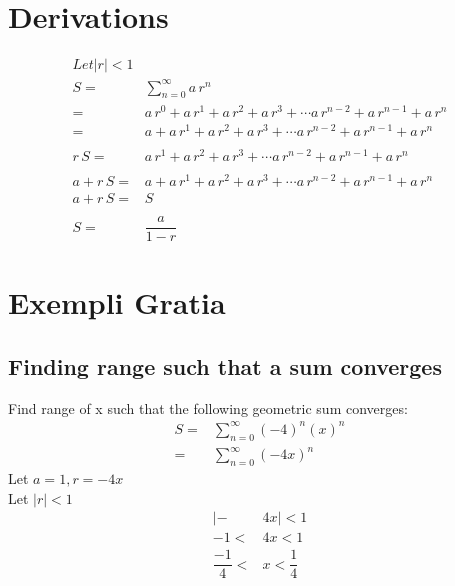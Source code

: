 \documentclass{article}
\begin{document}
\section{Derivations}
	\begin{align*}
			Let |r|<1\\
			S=&\sum_{n=0}^{\infty}a\,r^n\\
		 =&a\,r^0+a\,r^1+a\,r^2+a\,r^3+\cdots a\,r^{n-2}+a\,r^{n-1}+a\,r^{n}\\
		 =&a+a\,r^1+a\,r^2+a\,r^3+\cdots a\,r^{n-2}+a\,r^{n-1}+a\,r^{n}\\
		 \\
		 r\,S=&a\,r^1+a\,r^2+a\,r^3+\cdots a\,r^{n-2}+a\,r^{n-1}+a\,r^{n}\\
		 \\
		 a+r\,S=&a+a\,r^1+a\,r^2+a\,r^3+\cdots a\,r^{n-2}+a\,r^{n-1}+a\,r^{n}\\
		 a+r\,S=&S\\
		 \\
		 S=&\dfrac{a}{1-r}
	\end{align*}

\section{Exempli Gratia}

\subsection{Finding range such that a sum converges}

Find range of x such that the following geometric sum converges:
\begin{align*}
	S=&\sum_{n=0}^{\infty}(-4)^n(x)^n\\
	 =&\sum_{n=0}^{\infty}(-4x)^n
\end{align*}
\centering Let $a = 1, r = -4x$\\
Let $|r|<1$
\begin{align*}
	|-&4x|<1\\
	-1<&4x<1\\
	\dfrac{-1}{4}<&x<\dfrac{1}{4}
\end{align*}
\end{document}
